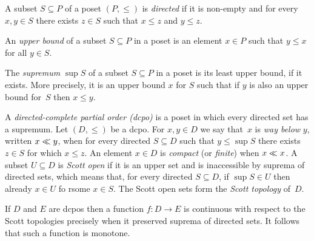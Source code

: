 A subset $S \subseteq P$ of a poset $(P, {\leq})$ is \emph{directed}
if it is non-empty and for every $x, y \in S$ there exists $z \in S$
such that $x \leq z$ and $y \leq z$.

An \emph{upper bound} of a subset $S \subseteq P$ in a poset is an
element $x \in P$ such that $y \leq x$ for all $y \in S$.

The \emph{supremum} $\sup S$ of a subset $S \subseteq P$ in a poset is
its least upper bound, if it exists. More precisely, it is an upper
bound $x$ for $S$ such that if $y$ is also an upper bound for~$S$ then
$x \leq y$.

A \emph{directed-complete partial order (dcpo)} is a poset in which
every directed set has a supremum. Let $(D, {\leq})$ be a dcpo. For
$x, y \in D$ we say that~$x$ is \emph{way below} $y$, written $x \ll
y$, when for every directed $S \subseteq D$ such that $y \leq \sup S$
there exists $z \in S$ for which $x \leq z$. An element $x \in D$ is
\emph{compact} (or \emph{finite}) when $x \ll x$. A subset $U
\subseteq D$ is \emph{Scott open} if it is an upper set and is
inaccessible by suprema of directed sets, which means that, for every
directed $S \subseteq D$, if $\sup S \in U$ then already $x \in U$ fo
rsome $x \in S$. The Scott open sets form the \emph{Scott topology}
of~$D$.

If $D$ and $E$ are dcpos then a function $f : D \to E$ is continuous
with respect to the Scott topologies precisely when it preserved
suprema of directed sets. It follows that such a function is monotone.




